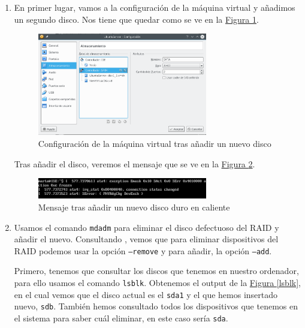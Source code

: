 \documentclass[10pt,a4paper,spanish]{article}
\numberwithin{equation}{section} %
\numberwithin{figure}{section} %
\numberwithin{table}{section} %
\begin{document}
\begin{enumerate}[1.]
    \item En primer lugar, vamos a la configuración de la máquina virtual y añadimos un segundo disco. Nos tiene que quedar como se ve en la \hyperref[newdisk]{Figura \ref*{newdisk}}.

    \begin{figure}[!h]
    \centering
    \includegraphics[width=0.7\textwidth]{3}
    \caption{Configuración de la máquina virtual tras añadir un nuevo disco}
    \label{newdisk}
    \end{figure}

    Tras añadir el disco, veremos el mensaje que se ve en la \hyperref[mensaje]{Figura \ref*{mensaje}}.
    \begin{figure}[!h]
        \centering
        \includegraphics[width=0.7\textwidth]{4}
        \caption{Mensaje tras añadir un nuevo disco duro en caliente}
        \label{mensaje}
    \end{figure}

    \item Usamos el comando \texttt{mdadm} para eliminar el disco defectuoso del RAID y añadir el nuevo. Consultando \cite{mdadm}, vemos que para eliminar dispositivos del RAID podemos usar la opción \texttt{--remove} y para añadir, la opción \texttt{--add}.

    Primero, tenemos que consultar los discos que tenemos en nuestro ordenador, para ello usamos el comando \texttt{lsblk}. Obtenemos el output de la \hyperref[lsblk]{Figura \ref*{lsblk}}, en el cual vemos que el disco actual es el \texttt{sda1} y el que hemos insertado nuevo, \texttt{sdb}. También hemos consultado todos los dispositivos que tenemos en el sistema para saber cuál eliminar, en este caso sería \texttt{sda}.


\end{enumerate}
\end{document}
